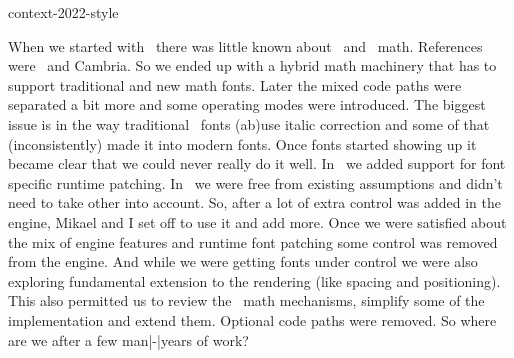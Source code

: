 
\environment context-2022-style

\startdocument
  [title={CTX Math},
   banner={the updated engine},
   location={context\enspace {\bf 2022}\enspace meeting}]

\starttitle[title=A little history]

\startitemize
    \startitem
        When we started with \LUATEX\ there was little known about
        \UNICODE\ and \OPENTYPE\ math. References were \MSWORD\ and
        Cambria.
    \stopitem
    \startitem
        So we ended up with a hybrid math machinery that has to
        support traditional and new math fonts.
    \stopitem
    \startitem
        Later the mixed code paths were separated a bit more and some operating
        modes were introduced. The biggest issue is in the way traditional \TEX\
        fonts (ab)use italic correction and some of that (inconsistently) made it
        into modern fonts.
    \stopitem
    \startitem
        Once fonts started showing up it became clear that we could
        never really do it well. In \CONTEXT\ we added support for
        font specific runtime patching.
    \stopitem
    \startitem
        In \LUAMETATEX\ we were free from existing assumptions and didn't need
        to take other \quote {frozen in time assumptions} into account.
    \stopitem
    \startitem
        So, after a lot of extra control was added in the engine, Mikael and I set
        off to use it and add more.
    \stopitem
    \startitem
        Once we were satisfied about the mix of engine features and runtime
        font patching some control was removed from the engine.
    \stopitem
    \startitem
        And while we were getting fonts under control we were also exploring
        fundamental extension to the rendering (like spacing and positioning).
    \stopitem
    \startitem
        This also permitted us to review the \CONTEXT\ math mechanisms, simplify some
        of the implementation and extend them. Optional code paths were removed.
    \stopitem
    \startitem
        So where are we after a few man|-|years of work?
    \stopitem
\stopitemize

\stoptitle

\starttitle[title=The process]

